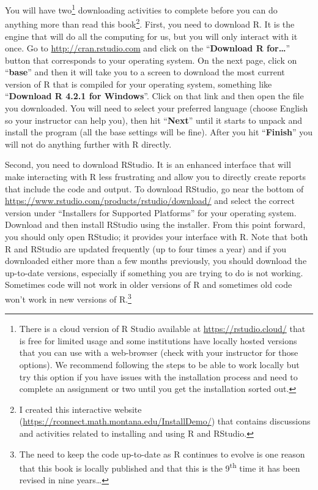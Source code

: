 \documentclass[
]{book}
\begin{document}
\indent You will have two\footnote{There is a cloud version of R Studio available at \url{https://rstudio.cloud/} that is free for limited usage and some institutions have locally hosted versions that you can use with a web-browser (check with your instructor for those options). We recommend following the steps to be able to work locally but try this option if you have issues with the installation process and need to complete an assignment or two until you get the installation sorted out.} downloading activities to complete before you can do anything
more than read this book\footnote{I created this interactive website (\url{https://rconnect.math.montana.edu/InstallDemo/}) that contains discussions and activities related to installing and using R and RStudio.}. First, you need to download R. It is the engine that will do all the computing
for us, but you will only interact with it once. Go to \url{http://cran.rstudio.com}
and click on the ``\textbf{Download R for\ldots{}}'' button that
corresponds to your operating system. On the next page, click on ``\textbf{base}'' and then it will take you
to a screen to download the most current version of R that is compiled for your
operating system, something like ``\textbf{Download R 4.2.1 for Windows}''. Click on that link and then open
the file you downloaded. You will need to select your preferred language (choose English so your instructor can help you), then hit ``\textbf{Next}''
until it starts to unpack and install the program (all the base settings will be fine). After you hit ``\textbf{Finish}'' you will not do anything further with R directly.

\indent Second, you need to download RStudio. It is an enhanced interface that will make interacting with
R less frustrating and allow you to directly create reports that include the code and output. To download RStudio, go near the bottom of \url{https://www.rstudio.com/products/rstudio/download/} and select the correct version under
``Installers for Supported Platforms'' for your operating system. Download and
then install RStudio using the installer. From this point forward, you should only
open RStudio; it provides your interface with R. Note that both R and RStudio
are updated frequently (up to four times a year) and if you downloaded either
more than a few months previously, you should download the up-to-date versions,
especially if something you are trying to do is not working. Sometimes code
will not work in older versions of R and sometimes old code won't work in new
versions of R.\footnote{The need to keep the code up-to-date as R continues to evolve is
  one reason that this book is locally published and that this is the 9\textsuperscript{th} time
  it has been revised in nine years\ldots{}}
\end{document}
